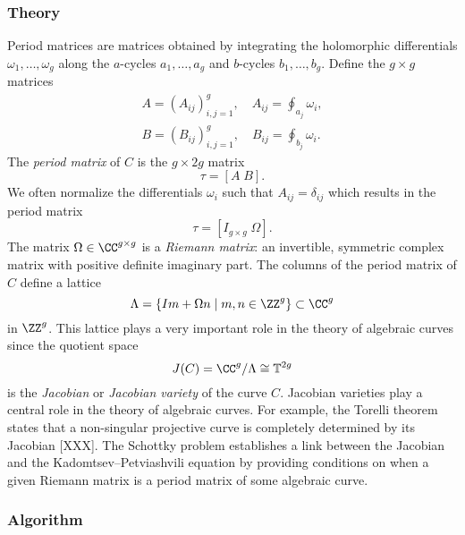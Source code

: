%
\subsubsection*{Theory}
%

Period matrices are matrices obtained by integrating the holomorphic
differentials $\omega_1, \ldots, \omega_g$ along the $a$-cycles
$a_1,\ldots,a_g$ and $b$-cycles $b_1,\ldots,b_g$. Define the $g \times g$
matrices
\begin{align} \label{eqn: period-matrices}
    A = \left( A_{ij} \right)_{i,j=1}^g,
    \quad A_{ij} = \oint_{a_j} \omega_i, \\
    B = \left( B_{ij} \right)_{i,j=1}^g,
    \quad B_{ij} = \oint_{b_j} \omega_i.
\end{align}
The {\it period matrix} of $C$ is the $g \times 2g$ matrix
\begin{equation} \label{eqn: period-matrix}
  \tau = \left[ A \; B \right].
\end{equation}
We often normalize the differentials $\omega_i$ such that $A_{ij} =
\delta_{ij}$ which results in the period matrix
\[
  \tau = \left[ I_{g \times g} \; \Omega \right].
\]
The matrix $\Omega \in \CC^{g \times g}$ is a {\it Riemann matrix}: an
invertible, symmetric complex matrix with positive definite imaginary
part. The columns of the period matrix of $C$ define a lattice
\begin{equation} \label{eqn: period-lattice}
    \Lambda = \{I m + \Omega n \; | \; m,n \in \ZZ^g\} \subset \CC^g
\end{equation}
in $\ZZ^g$. This lattice plays a very important role in the theory of
algebraic curves since the quotient space
\begin{equation} \label{eqn: jacobian}
  J(C) = \CC^g / \Lambda \cong \mathbb{T}^{2g}
\end{equation}
is the {\it Jacobian} or {\it Jacobian variety} of the curve
$C$. Jacobian varieties play a central role in the theory of algebraic
curves. For example, the Torelli theorem states that a non-singular
projective curve is completely determined by its Jacobian [XXX]. The
Schottky problem establishes a link between the Jacobian and the
Kadomtsev--Petviashvili equation by providing conditions on when a given
Riemann matrix is a period matrix of some algebraic curve.


%
\subsubsection*{Algorithm}
%

